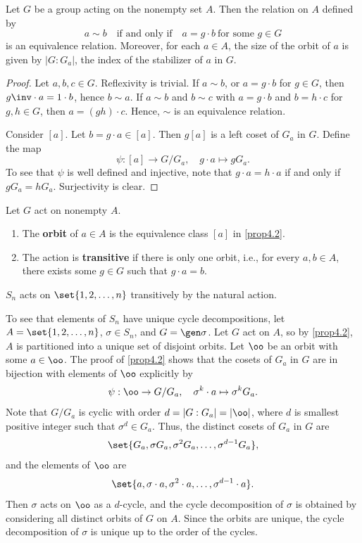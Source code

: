 \begin{prop}
    \label{prop4.2}
    Let $G$ be a group acting on the nonempty set $A$. Then the relation on $A$ defined by
    \[a \sim b \quad \text{if and only if} \quad a = g \cdot b~\text{for some $g\in G$}\]
    is an equivalence relation. Moreover, for each $a \in A$, the size of the orbit of $a$ is given by $|G : G_a|$, the index of the stabilizer of $a$ in $G$.
    \begin{proof}
        Let $a, b, c \in G$. Reflexivity is trivial. If $a \sim b$, or $a = g \cdot b$ for $g \in G$, then $g\inv \cdot a = 1 \cdot b$, hence $b \sim a$. If $a \sim b$ and $b \sim c$ with $a = g \cdot b$ and $b = h \cdot c$ for $g, h \in G$, then $a = (gh) \cdot c$. Hence, $\sim$ is an equivalence relation.

        Consider $[a]$. Let $b = g \cdot a \in [a]$. Then $g [a]$ is a left coset of $G_a$ in $G$. Define the map
        \[\psi : [a] \to G/G_a, \quad g \cdot a \mapsto gG_a.\]
        To see that $\psi$ is well defined and injective, note that $g \cdot a = h \cdot a$ if and only if $gG_a = hG_a$. Surjectivity is clear.
    \end{proof}
\end{prop}

 Let $G$ act on nonempty $A$.
\begin{enumerate}
    \item The \textbf{orbit} of $a \in A$ is the equivalence class $[a]$ in \autoref{prop4.2}.
    \item The action is \textbf{transitive} if there is only one orbit, i.e., for every $a, b \in A$, there exists some $g \in G$ such that $g \cdot a = b$.
\end{enumerate}

\ex $S_n$ acts on $\set{1, 2, \ldots, n}$ transitively by the natural action.

\note To see that elements of $S_n$ have unique cycle decompositions, let $A = \set{1, 2, \ldots, n}$, $\sigma \in S_n$, and $G = \gen\sigma$. Let $G$ act on $A$, so by \autoref{prop4.2}, $A$ is partitioned into a unique set of disjoint orbits. Let $\oo$ be an orbit with some $a \in \oo$. The proof of \autoref{prop4.2} shows that the cosets of $G_a$ in $G$ are in bijection with elements of $\oo$ explicitly by
\[\psi : \oo \to G/G_a, \quad \sigma^k \cdot a \mapsto \sigma^k G_a.\]
Note that $G/G_a$ is cyclic with order $d = |G : G_a| = |\oo|$, where $d$ is smallest positive integer such that $\sigma^d \in G_a$. Thus, the distinct cosets of $G_a$ in $G$ are
\[\set{G_a, \sigma G_a, \sigma^2 G_a, \ldots, \sigma^{d-1}G_a},\]
and the elements of $\oo$ are
\[\set{a, \sigma \cdot a, \sigma^2 \cdot a, \ldots, \sigma^{d-1} \cdot a}.\]
Then $\sigma$ acts on $\oo$ as a $d$-cycle, and the cycle decomposition of $\sigma$ is obtained by considering all distinct orbits of $G$ on $A$. Since the orbits are unique, the cycle decomposition of $\sigma$ is unique up to the order of the cycles.
\newpage

